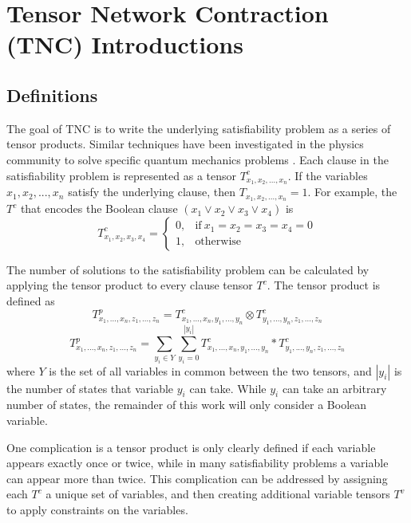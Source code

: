 \documentclass[12pt,twocolumn]{article}
\newcommand{\ten}{\fontsize{10pt}{\baselineskip}\selectfont}    %
\begin{document}
\hypertarget{tensor-network-contraction-tnc-introductions}{%
\section{Tensor Network Contraction (TNC) Introductions}\label{tensor-network-contraction-tnc-introductions}}

\hypertarget{definitions}{%
\subsection{Definitions}\label{definitions}}

The goal of TNC is to write the underlying satisfiability problem as a series of tensor products. Similar techniques have been investigated in the physics community to solve specific quantum mechanics problems \cite{pan2020contracting} \cite{biamonte2019lectures}. Each clause in the satisfiability problem is represented as a tensor \(T^c_{x_1,x_2,...,x_n}\). If the variables \(x_1,x_2,...,x_n\) satisfy the underlying clause, then \(T_{x_1,x_2,...,x_n}=1\). For example, the \(T^c\) that encodes the Boolean clause \((x_1 \lor x_2 \lor x_3 \lor x_4)\) is \begin{equation*}
T^c_{x_1,x_2,x_3,x_4}=
\begin{cases}
  0, & \text{if}\ x_1=x_2=x_3=x_4=0 \\
  1, & \text{otherwise}
\end{cases}
\end{equation*}

The number of solutions to the satisfiability problem can be calculated by applying the tensor product to every clause tensor \(T^c\). The tensor product is defined as \[T^p_{x_1,...,x_n,z_1,...,z_n}=T^c_{x_1,...,x_n,y_1,...,y_n} \otimes T^c_{y_1,...,y_n,z_1,...,z_n}\] \ten \[T^p_{x_1,...,x_n,z_1,...,z_n}=\sum_{y_i \in Y} \sum_{y_i=0}^{|y_i|} T^c_{x_1,...,x_n,y_1,...,y_n} * T^c_{y_1,...,y_n,z_1,...,z_n}\] \normalsize where \(Y\) is the set of all variables in common between the two tensors, and \(|y_i|\) is the number of states that variable \(y_i\) can take. While \(y_i\) can take an arbitrary number of states, the remainder of this work will only consider a Boolean variable.

One complication is a tensor product is only clearly defined if each variable appears exactly once or twice, while in many satisfiability problems a variable can appear more than twice. This complication can be addressed by assigning each \(T^c\) a unique set of variables, and then creating additional variable tensors \(T^v\) to apply constraints on the variables.
\end{document}
